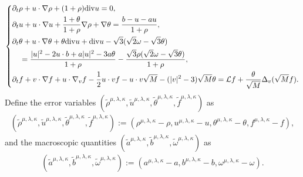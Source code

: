 \documentclass[reqno,11pt]{amsart}
\theoremstyle{plain}
\numberwithin{equation}{section}
\begin{document}
\begin{equation}\label{G4.2}
\left\{\begin{aligned}
&\partial_t \rho + u\cdot\nabla\rho+(1+\rho){\rm div} u=0, \\
&\partial_t u +u \cdot \nabla u+\frac{1+\theta}{1+\rho} \nabla \rho+\nabla \theta=\frac{b-u-au}{1+\rho}, \\
&\partial_t \theta +u \cdot \nabla \theta+\theta  {\rm div} u+ {\rm div} u-\sqrt{3}(\sqrt{2} \omega-\sqrt{3} \theta)  \\
&\quad =\frac{ |u|^2-2 u \cdot b+a|u|^2-3 a \theta}{1+\rho}   -\frac{\sqrt{3}\rho(\sqrt{2} \omega-\sqrt{3} \theta)}{1+\rho},\\
&\partial_t f +v \cdot \nabla f+u \cdot \nabla_v f-\frac{1}{2} u \cdot v f-
u \cdot v \sqrt{M}- (|v|^2-3 ) \sqrt{M} \theta   =\mathcal{L} f+\frac{\theta}{\sqrt{M}} \Delta_v(\sqrt{M} f).
\end{aligned}\right.
\end{equation}  
Define the error variables  $(\widetilde{\rho}^{\mu,\lambda,\kappa},\widetilde{u}^{\mu,\lambda,\kappa},\widetilde{\theta}^{\mu,\lambda,\kappa},\widetilde{f}^{\mu,\lambda,\kappa})$ as 
\begin{align*}
(\widetilde{\rho}^{\mu,\lambda,\kappa},\widetilde{u}^{\mu,\lambda,\kappa},\widetilde{\theta}^{\mu,\lambda,\kappa},\widetilde{f}^{\mu,\lambda,\kappa}):=(\rho^{\mu,\lambda,\kappa}-\rho, u^{\mu,\lambda,\kappa}-u, \theta^{\mu,\lambda,\kappa}-\theta, f^{\mu,\lambda,\kappa}-f),    
\end{align*}
and the macroscopic quantities $(\widetilde{a}^{\mu,\lambda,\kappa},\widetilde{b}^{\mu,\lambda,\kappa},\widetilde{\omega}^{\mu,\lambda,\kappa})$ as 
\begin{equation*}
\begin{aligned}
(\widetilde{a}^{\mu,\lambda,\kappa},\widetilde{b}^{\mu,\lambda,\kappa},\widetilde{\omega}^{\mu,\lambda,\kappa}):=(a^{\mu,\lambda,\kappa}-a , b^{\mu,\lambda,\kappa}-b,\omega^{\mu,\lambda,\kappa}-\omega ).
\end{aligned}
\end{equation*}    
\end{document}
